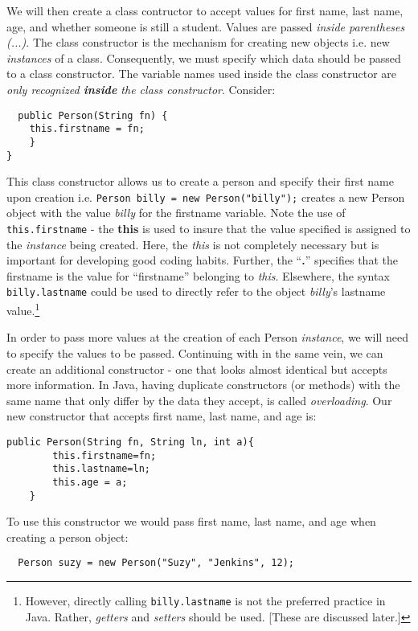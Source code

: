 \documentclass{article}
\begin{document}
\begin{flushleft}
We will then create a class contructor to accept values for first name, last name, age, and whether someone is still a student. Values are passed \emph{inside parentheses (...)}. The class constructor is the mechanism for creating new objects i.e. new \emph{instances} of a class. Consequently, we must specify which data should be passed to a class constructor. The variable names used inside the class constructor are \emph{only recognized \textbf{inside} the class constructor}. Consider:
\begin{verbatim}
  public Person(String fn) {
    this.firstname = fn;
    }
}
\end{verbatim}
This class constructor allows us to create a person and specify their first name upon creation i.e. \texttt{Person billy = new Person("billy");} creates a new Person object with the value \emph{billy} for the firstname variable. Note the use of \texttt{this.firstname} - the \textbf{this} is used to insure that the value specified is assigned to the \emph{instance} being created. Here, the \emph{this} is not completely necessary but is important for developing good coding habits. Further, the ``\textbf{.}'' specifies that the firstname is the value for ``firstname'' belonging to \emph{this}. Elsewhere, the syntax \texttt{billy.lastname} could be used to directly refer to the object \emph{billy}'s lastname value.\footnote{However, directly calling \texttt{billy.lastname} is not the preferred practice in Java. Rather, \emph{getters} and \emph{setters} should be used. [These are discussed later.]}\par
In order to pass more values at the creation of each Person \emph{instance}, we will need to specify the values to be passed. Continuing with in the same vein, we can create an additional constructor - one that looks almost identical but accepts more information. In Java, having duplicate constructors (or methods) with the same name that only differ by the data they accept, is called \emph{overloading}. Our new constructor that accepts first name, last name, and age is:
\begin{verbatim}
public Person(String fn, String ln, int a){
        this.firstname=fn; 
        this.lastname=ln;
        this.age = a; 
    }
\end{verbatim}

To use this constructor we would pass first name, last name, and age when creating a person object:\\
\begin{verbatim}
  Person suzy = new Person("Suzy", "Jenkins", 12);
\end{verbatim}


\end{flushleft}
\end{document}
